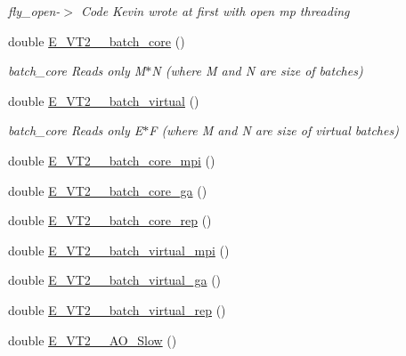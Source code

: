 \begin{DoxyCompactItemize}
\begin{DoxyCompactList}\small\item\em fly\+\_\+open-\/$>$ Code Kevin wrote at first with open mp threading \end{DoxyCompactList}\item 
double \mbox{\hyperlink{classforte_1_1_t_h_r_e_e___d_s_r_g___m_r_p_t2_a6a84aade3b602722ad7f0842865128db}{E\+\_\+\+V\+T2\+\_\+\_\+batch\+\_\+core}} ()
\begin{DoxyCompactList}\small\item\em batch\+\_\+core Reads only M$\ast$N (where M and N are size of batches) \end{DoxyCompactList}\item 
double \mbox{\hyperlink{classforte_1_1_t_h_r_e_e___d_s_r_g___m_r_p_t2_ac07886a03813611c13e79537515dd524}{E\+\_\+\+V\+T2\+\_\+\_\+batch\+\_\+virtual}} ()
\begin{DoxyCompactList}\small\item\em batch\+\_\+core Reads only E$\ast$F (where M and N are size of virtual batches) \end{DoxyCompactList}\item 
double \mbox{\hyperlink{classforte_1_1_t_h_r_e_e___d_s_r_g___m_r_p_t2_abdafa75f6da4ce3d180078003eedfec3}{E\+\_\+\+V\+T2\+\_\+\_\+batch\+\_\+core\+\_\+mpi}} ()
\item 
double \mbox{\hyperlink{classforte_1_1_t_h_r_e_e___d_s_r_g___m_r_p_t2_ab81ba66bcdb555200e6193274b6abc10}{E\+\_\+\+V\+T2\+\_\+\_\+batch\+\_\+core\+\_\+ga}} ()
\item 
double \mbox{\hyperlink{classforte_1_1_t_h_r_e_e___d_s_r_g___m_r_p_t2_a8a6ddf704b1173c6a3235dcd34440c81}{E\+\_\+\+V\+T2\+\_\+\_\+batch\+\_\+core\+\_\+rep}} ()
\item 
double \mbox{\hyperlink{classforte_1_1_t_h_r_e_e___d_s_r_g___m_r_p_t2_a386073c8a321f9c1d4f2fa75f0f41ed0}{E\+\_\+\+V\+T2\+\_\+\_\+batch\+\_\+virtual\+\_\+mpi}} ()
\item 
double \mbox{\hyperlink{classforte_1_1_t_h_r_e_e___d_s_r_g___m_r_p_t2_a0a957fdc98b6323f50a426ad82a0f345}{E\+\_\+\+V\+T2\+\_\+\_\+batch\+\_\+virtual\+\_\+ga}} ()
\item 
double \mbox{\hyperlink{classforte_1_1_t_h_r_e_e___d_s_r_g___m_r_p_t2_aa15bdfa7ba4a5ec6c75c50d0d119888b}{E\+\_\+\+V\+T2\+\_\+\_\+batch\+\_\+virtual\+\_\+rep}} ()
\item 
double \mbox{\hyperlink{classforte_1_1_t_h_r_e_e___d_s_r_g___m_r_p_t2_ab38abe60c8e786fdf3becd1fe6f8c70f}{E\+\_\+\+V\+T2\+\_\+\_\+\+A\+O\+\_\+\+Slow}} ()

\end{DoxyCompactItemize}
